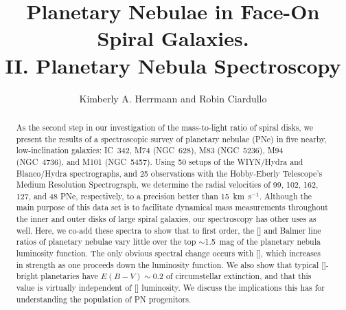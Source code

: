 \documentclass[12pt,preprint]{emulateapj}
\newcommand{\kms}{km~s$^{-1}$}
\begin{document}
\title{Planetary Nebulae in Face-On Spiral Galaxies. \\ II. Planetary Nebula Spectroscopy}

\author{Kimberly A. Herrmann and Robin Ciardullo}




\begin{abstract}
As the second step in our investigation of the mass-to-light ratio of spiral disks, we present the results of a spectroscopic survey of planetary nebulae (PNe) in five nearby, low-inclination galaxies: IC~342, M74 (NGC~628), M83 (NGC~5236), M94 (NGC~4736), and M101 (NGC~5457).  Using 50 setups of the WIYN/Hydra and Blanco/Hydra spectrographs, and 25 observations with the Hobby-Eberly Telescope's Medium Resolution Spectrograph, we determine the radial velocities of 99, 102, 162, 127, and 48 PNe, respectively, to a precision better than 15~\kms.   Although the main purpose of this data set is to facilitate dynamical mass measurements throughout the inner and outer disks of large spiral galaxies, our spectroscopy has other uses as well.  Here, we co-add these spectra to show that to first order, the [] and Balmer line ratios of planetary nebulae vary little over the top $\sim$1.5~mag of the planetary nebula luminosity function.  The only obvious spectral change occurs with [], which increases in strength as one proceeds down the luminosity function.  We also show that typical []-bright planetaries have $E(B-V) \sim 0.2$ of circumstellar extinction, and that this value is virtually independent of [] luminosity.  We discuss the implications this has for understanding the population of PN progenitors. 

\end{abstract}
\end{document}
